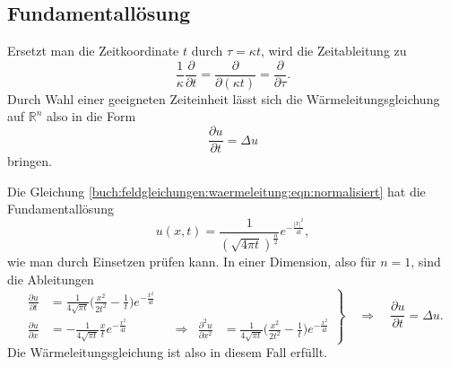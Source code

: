 %
%
\subsection{Fundamentallösung}
Ersetzt man die Zeitkoordinate $t$ durch $\tau=\kappa t$, wird die
Zeitableitung zu
\[
\frac{1}{\kappa}
\frac{\partial}{\partial t}
=
\frac{\partial}{\partial (\kappa t)}
=
\frac{\partial}{\partial\tau}.
\]
Durch Wahl einer geeigneten Zeiteinheit lässt sich die 
Wärmeleitungsgleichung auf $\mathbb{R}^n$ also in die Form
\begin{equation}
\frac{\partial u}{\partial t}
=
\Delta u
\label{buch:feldgleichungen:waermeleitung:eqn:normalisiert}
\end{equation}
bringen.

Die Gleichung \eqref{buch:feldgleichungen:waermeleitung:eqn:normalisiert}
hat die Fundamentallösung
\begin{equation}
u(x,t)
=
\frac{1}{(\!\sqrt{4\pi t})^{\frac{n}2}}
e^{-\frac{|x|^2}{4t}}
,
\label{buch:feldgleichungen:waermeleitung:eqn:fundamentalloesung}
\end{equation}
wie man durch Einsetzen prüfen kann.
In einer Dimension, also für $n=1$, sind die Ableitungen
\[
\left.
\begin{aligned}
\frac{\partial u}{\partial t}
&=
\frac{1}{4\!\sqrt{\pi t}}
\biggl(
\frac{x^2}{2t^2}
-
\frac{1}{t}
\biggr)
e^{-\frac{x^2}{4t}}
\\
\frac{\partial u}{\partial x}
&=
-
\frac{1}{4\!\sqrt{\pi t}} \frac{x}{t} e^{-\frac{x^2}{4t}}
&&\Rightarrow&
\frac{\partial^2 u}{\partial x^2}
&=
\frac{1}{4\!\sqrt{\pi t}}
\biggl(
\frac{x^2}{2t^2}
-\frac{1}{t}
\biggr)
e^{-\frac{x^2}{4t}}
\end{aligned}
\right\}
\quad
\Rightarrow
\quad
\frac{\partial u}{\partial t}=\Delta u.
\]
Die Wärmeleitungsgleichung ist also in diesem Fall erfüllt.

